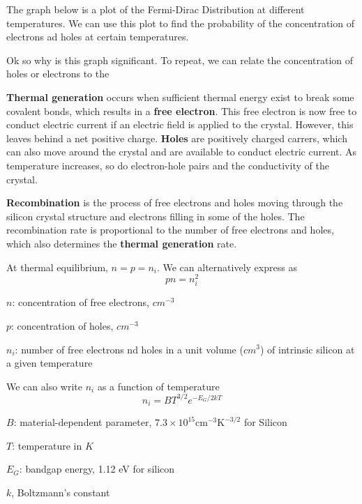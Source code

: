 The graph below is a plot of the Fermi-Dirac Distribution at different temperatures. We can use this plot to find the probability of the concentration of electrons ad holes at certain temperatures.

Ok so why is this graph significant. To repeat, we can relate the concentration of holes or electrons to the 

\textbf{Thermal generation} occurs when sufficient thermal energy exist to break some covalent bonds, which results in a \textbf{free electron}. This free electron is now free to conduct electric current if an electric field is applied to the crystal. However, this leaves behind a net positive charge. \textbf{Holes} are positively charged carrers, which can also move around the crystal and are available to conduct electric current. As temperature increases, so do electron-hole pairs and the conductivity of the crystal. 

\textbf{Recombination} is the process of free electrons and  holes moving through the silicon crystal structure and electrons filling in some of the holes. The recombination rate is proportional to the number of free electrons and holes, which also determines the \textbf{thermal generation} rate.

At thermal equilibrium, $n = p = n_i$. We can alternatively express as
\[pn = n_i^2\]
\begin{gline}
    \item $n$: concentration of free electrons, $cm^{-3}$
    \item $p$: concentration of holes, $cm^{-3}$
    \item $n_i$: number of free electrons nd holes in a unit volume ($cm^3$) of intrinsic silicon at a given temperature
\end{gline}

We can also write $n_i$ as a function of temperature
\[n_i = BT^{3/2} e^{-E_G / 2kT}\]
\begin{gline}
    \item $B$: material-dependent parameter, $7.3 \times 10^{15} \text{cm}^{-3} \text{K}^{-3/2}$ for Silicon
    \item $T$: temperature in $K$
    \item $E_G$: bandgap energy, 1.12 eV for silicon
    \item $k$, Boltzmann's constant
\end{gline}

